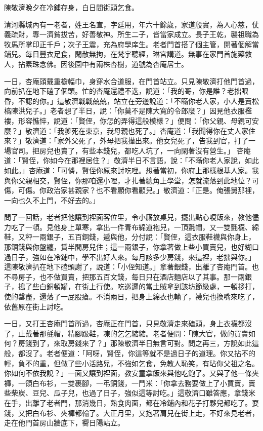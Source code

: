 陳敬濟晚夕在冷鋪存身，白日間街頭乞食。

清河縣城內有一老者，姓王名宣，字廷用，年六十餘歲，家道殷實，為人心慈，仗義疏財，專一濟貧拔苦，好善敬神。所生二子，皆當家成立。長子王乾，襲祖職為牧馬所掌印正千戶；次子王震，充為府學庠生。老者門首搭了個主管，開著個解當鋪兒。每日豐衣足食，閑散無拘，在梵宇聽經，琳宮講道。無事在家門首施藥救人，拈素珠念佛。因後園中有兩株杏樹，道號為杏庵居士。

一日，杏庵頭戴重檐幅巾，身穿水合道服，在門首站立。只見陳敬濟打他門首過，向前扒在地下磕了個頭。忙的杏庵還禮不迭，說道：「我的哥，你是誰？老拙眼昏，不認的你。」這敬濟戰戰兢兢，站立在旁邊說道：「不瞞你老人家，小人是賣松槁陳洪兒子。」老者想了半日，說：「你莫不是陳大寬的令郎麼？」因見他衣服襤褸，形容憔悴，說道：「賢侄，你怎的弄得這般模樣？」便問：「你父親、母親可安麼？」敬濟道：「我爹死在東京，我母親也死了。」杏庵道：「我聞得你在丈人家住來？」敬濟道：「家外父死了，外母把我攆出來。他女兒死了，告我到官，打了一場官司。把房兒也賣了，有些本錢兒，都吃人坑了，一向閑著沒有營生。」 杏庵道：「賢侄，你如今在那裡居住？」敬濟半日不言語，說：「不瞞你老人家說，如此如此。」杏庵道：「可憐，賢侄你原來討吃哩。想著當初，你府上那樣根基人家。我與你父親相交，賢侄，你那咱還小哩，才扎著總角上學堂，怎就流落到此地位？可傷，可傷。你政治家甚親家？也不看顧你看顧兒。」敬濟道：「正是。俺張舅那裡，一向也久不上門，不好去的。」

問了一回話，老者把他讓到裡面客位里，令小廝放桌兒，擺出點心嗄飯來，教他儘力吃了一頓。見他身上單寒，拿出一件青布綿道袍兒，一頂氈帽，又一雙氈襪、綿鞋，又秤一兩銀子，五百銅錢，遞與他，分付說：「賢侄，這衣服鞋襪與你身上，那銅錢與你盤纏，賃半間房兒住；這一兩銀子，你拿著做上些小買賣兒，也好糊口過日子，強如在冷鋪中，學不出好人來。每月該多少房錢，來這裡，老拙與你。」這陳敬濟扒在地下磕頭謝了，說道：「小侄知道。」拿著銀錢，出離了杏庵門首。也不尋房子，也不做買賣，把那五百文錢，每日只在酒店麵店以了其事。那一兩銀子，搗了些白銅頓罐，在街上行使。吃巡邏的當土賊拿到該坊節級處，一頓拶打，使的罄盡，還落了一屁股瘡。不消兩日，把身上綿衣也輸了，襪兒也換嘴來吃了，依舊原在街上討吃。

一日，又打王杏庵門首所過，杏庵正在門首，只見敬濟走來磕頭，身上衣襪都沒了，止戴著那氈帽，精腳趿鞋，凍的乞乞縮縮。老者便問：「陳大官，做的買賣如何？房錢到了，來取房錢來了？」那陳敬濟半日無言可對。問之再三，方說如此這般，都沒了。老者便道：「阿呀，賢侄，你這等就不是過日子的道理。你又拈不的輕，負不的重，但做了些小活路兒，不強如乞食，免教人恥笑，有玷你父祖之名。你如何不依我說？」一面又讓到裡面，教安童拿飯來與他吃飽了。又與了他一條夾褲，一領白布衫，一雙裹腳，一弔銅錢，一鬥米：「你拿去務要做上了小買賣，賣些柴炭、豆兒、瓜子兒，也過了日子，強似這等討吃。」這敬濟口雖答應，拿錢米在手，出離了老者門，那消幾日，熟食肉面，都在冷鋪內和花子打夥兒都吃了。耍錢，又把白布衫、夾褲都輸了。大正月里，又抱著肩兒在街上走，不好來見老者，走在他門首房山牆底下，嚮日陽站立。

